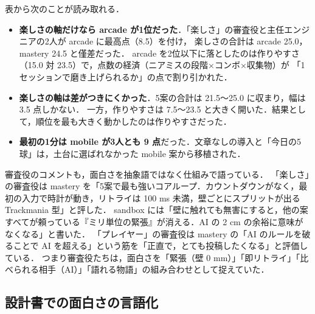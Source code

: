 \documentclass[a4paper,10pt]{ltjsarticle}
\begin{document}
表から次のことが読み取れる．
\begin{itemize}
  \item \textbf{楽しさの軸だけなら arcade が1位だった}．「楽しさ」の審査役と主任エンジニアの2人が arcade に最高点（8.5）を付け，
  楽しさの合計は arcade 25.0，mastery 24.5 と僅差だった．
  arcade を2位以下に落としたのは作りやすさ（15.0 対 23.5）で，点数の経済（ニアミスの段階×コンボ×収集物）が
  「1セッションで磨き上げられるか」の点で割り引かれた．
  \item \textbf{楽しさの軸は差がつきにくかった}．5案の合計は 21.5〜25.0 に収まり，幅は 3.5 点しかない．
  一方，作りやすさは 7.5〜23.5 と大きく開いた．結果として，順位を最も大きく動かしたのは作りやすさだった．
  \item \textbf{最初の1分は mobile が3人とも 9 点}だった．文章なしの導入と「今日の5球」は，土台に選ばれなかった mobile 案から移植された．
\end{itemize}

審査役のコメントも，面白さを抽象語ではなく仕組みで語っている．
「楽しさ」の審査役は mastery を「5案で最も強いコアループ．カウントダウンがなく，最初の入力で時計が動き，リトライは 100 ms 未満，壁ごとにスプリットが出る Trackmania 型」と評した．
sandbox には「壁に触れても無害にすると，他の案すべてが頼っている『ミリ単位の緊張』が消える．AI の 2 cm の余裕に意味がなくなる」と書いた．
「プレイヤー」の審査役は mastery の「AI のルールを破ることで AI を超える」という筋を「正直で，とても投稿したくなる」と評価している．
つまり審査役たちは，面白さを「緊張（壁 0 mm）」「即リトライ」「比べられる相手（AI）」「語れる物語」の組み合わせとして捉えていた．

\subsection{設計書での面白さの言語化}
\label{sec:fun-gdd}
\end{document}
